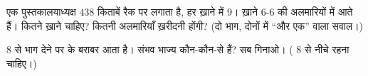\begin{exercise}[$\star\star$]\label{exo:g4:division:10}
एक पुस्तकालयाध्यक्ष $438$ किताबें रैक पर लगाता है, हर ख़ाने में
$9$। ख़ाने $6$-$6$ की अलमारियों में आते हैं। कितने ख़ाने चाहिए?
कितनी अलमारियाँ ख़रीदनी होंगी? (दो भाग, दोनों में
``और एक'' वाला सवाल।)
\end{exercise}

\begin{exercise}[$\star\star$]\label{exo:g4:division:11}
$8$ से भाग देने पर   के बराबर आता है। संभव भाज्य
कौन-कौन-से हैं? सब गिनाओ। ( $8$ से नीचे रहना
चाहिए।)
\end{exercise}
